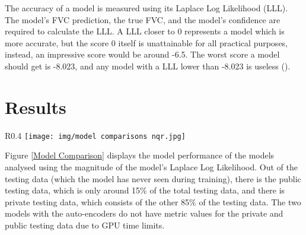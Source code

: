 \documentclass[12pt]{article}
\begin{document}
The accuracy of a model is measured using its Laplace Log Likelihood (LLL).
The model's FVC prediction, the true FVC, and the model's confidence are required to calculate the LLL. 
A LLL closer to 0 represents a model which is more accurate, but the score 0 itself is unattainable for all practical purposes, instead, an impressive score would be around -6.5.
The worst score a model should get is -8.023, and any model with a LLL lower than -8.023 is useless (\cite{laplaceloglikelihood}).

\section{Results}



\begin{wrapfigure}{R}{0.4\textwidth}
    \centering
    \texttt{[image: img/model comparisons nqr.jpg]}
    
    \caption{Comparison of Average Model LLL}
    \label{Model Comparison}
\end{wrapfigure}

Figure \ref{Model Comparison} displays the model performance of the models analysed using the magnitude of the model's Laplace Log Likelihood.
Out of the testing data (which the model has never seen during training), there is the public testing data, which is only around 15\% of the total testing data, and there is private testing data, which consists of the other 85\% of the testing data.
The two models with the auto-encoders do not have metric values for the private and public testing data due to GPU time limits.
\end{document}
